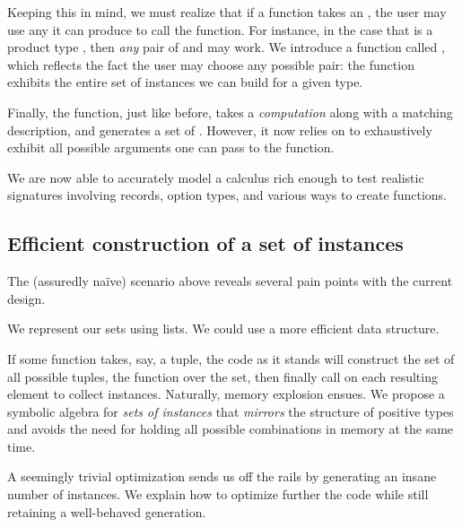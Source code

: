 Keeping this in mind, we must realize that if a function takes an , the
user may use any  it can produce to call the function. For instance, in
the case that  is a product type , then \emph{any} pair
of  and  may work.  We introduce a function called
, which reflects the fact the user may choose any possible pair:
the function exhibits the entire set of instances we can build for a given type.

Finally, the  function, just like before, takes a \emph{computation}
along with a matching description, and generates a set of . However, it
now relies on  to exhaustively exhibit all possible arguments one
can pass to the function.

We are now able to accurately model a calculus rich enough to test realistic
signatures involving records, option types, and various ways to create
functions.

\subsection{Efficient construction of a set of instances}
\label{sec:efficient}

The (assuredly naïve) scenario above reveals several pain points with the
current design.
\begin{compactitem}
  \item We represent our sets using lists. We could use a more efficient data
    structure.
  \item If some function takes, say, a tuple, the code as it stands will
    construct the set of all possible tuples,  the function over the
    set, then finally call  on each resulting element to collect
    instances.  Naturally, memory explosion ensues. We propose a symbolic
    algebra for \emph{sets of instances} that \emph{mirrors} the structure of
    positive types and avoids the need for holding all possible combinations in
    memory at the same time.
  \item A seemingly trivial optimization sends us off the rails by generating an
    insane number of instances. We explain how to optimize further the code
    while still retaining a well-behaved generation.
\end{compactitem}
%

